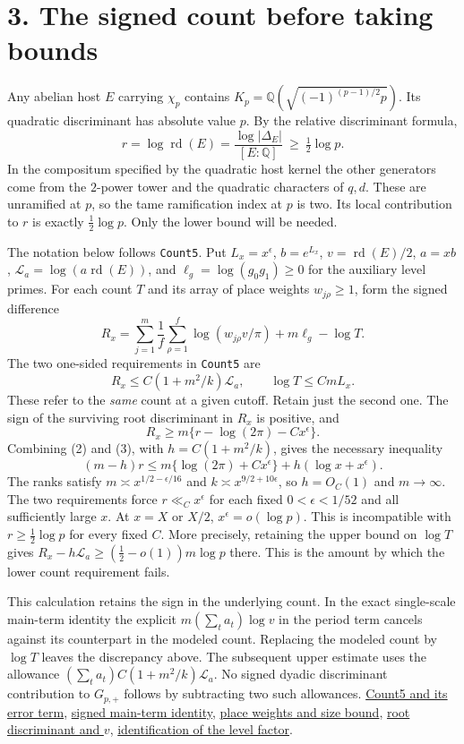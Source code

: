 \documentclass[11pt]{article}
\newcommand{\src}[2]{\href{https://github.com/Deicyde/riemann-hypothesis/blob/e7c8972c701d3396947808ab20cc16dc14623d33/src/#1.lean}{#2}}
\newcommand{\rd}{\operatorname{rd}}
\newcommand{\ch}{\chi_p}
\newcommand{\La}{\mathcal L_a}
\begin{document}
\newpage
\section*{3. The signed count before taking bounds}
Any abelian host $E$ carrying $\ch$ contains $K_p=\mathbb Q(\sqrt{(-1)^{(p-1)/2}p})$. Its quadratic discriminant has absolute value $p$. By the relative discriminant formula,
\[
 r=\log\rd(E)=\frac{\log|\Delta_E|}{[E:\mathbb Q]}
 \ \ge\ \tfrac12\log p .
\]
In the compositum specified by the quadratic host kernel the other generators come from the $2$-power tower and the quadratic characters of $q,d$. These are unramified at $p$, so the tame ramification index at $p$ is two. Its local contribution to $r$ is exactly $\tfrac12\log p$. Only the lower bound will be needed.

The notation below follows \texttt{Count5}. Put $L_x=x^\epsilon$, $b=e^{L_x}$, $v=\rd(E)/2$, $a=xb$, $\La=\log(a\rd(E))$, and $\ell_g=\log(g_0g_1)\ge0$ for the auxiliary level primes. For each count $T$ and its array of place weights $w_{j\rho}\ge1$, form the signed difference
\[
 R_x=\sum_{j=1}^{m}\frac{1}{f}\sum_{\rho=1}^{f}\log(w_{j\rho}v/\pi)
                  +m\ell_g-\log T .
\]
The two one-sided requirements in \texttt{Count5} are
\[
 R_x\le C(1+m^2/k)\La,\qquad \log T\le C m L_x. \tag{2}
\]
These refer to the \emph{same} count at a given cutoff. Retain just the second one. The sign of the surviving root discriminant in $R_x$ is positive, and
\[
 R_x \ge m\{r-\log(2\pi)-C x^\epsilon\}. \tag{3}
\]
Combining (2) and (3), with $h=C(1+m^2/k)$, gives the necessary inequality
\[
 (m-h)r\le m\{\log(2\pi)+Cx^\epsilon\}+h(\log x+x^\epsilon).
\]
The ranks satisfy $m\asymp x^{1/2-\epsilon/16}$ and $k\asymp x^{9/2+10\epsilon}$, so $h=O_C(1)$ and $m\to\infty$. The two requirements force $r\ll_C x^\epsilon$ for each fixed $0<\epsilon<1/52$ and all sufficiently large $x$. At $x=X$ or $X/2$, $x^\epsilon=o(\log p)$. This is incompatible with $r\ge\frac12\log p$ for every fixed $C$. More precisely, retaining the upper bound on $\log T$ gives $R_x-h\La\ge(\tfrac12-o(1))m\log p$ there. This is the amount by which the lower count requirement fails.

This calculation retains the sign in the underlying count. In the exact single-scale main-term identity the explicit $m(\sum_t a_t)\log v$ in the period term cancels against its counterpart in the modeled count. Replacing the modeled count by $\log T$ leaves the discrepancy above. The subsequent upper estimate uses the allowance $(\sum_t a_t)C(1+m^2/k)\La$. No signed dyadic discriminant contribution to $G_{p,+}$ follows by subtracting two such allowances. \src{Formalism/SizeWindowBrackets/QuotientSlopeBoundsWith}{Count5 and its error term}, \src{Formalism/RankGapBounds/RankGapProofs/WeightedMeanData}{signed main-term identity}, \src{Formalism/SharpRestriction/GlobalSchurBounds/QuadraticLogDerivCongr}{place weights and size bound}, \src{Formalism/LocalRingCardinality/DataHost}{root discriminant and $v$}, \src{Formalism/SharpRestriction/GlobalSchurBounds/TieGlobal}{identification of the level factor}.
\end{document}

